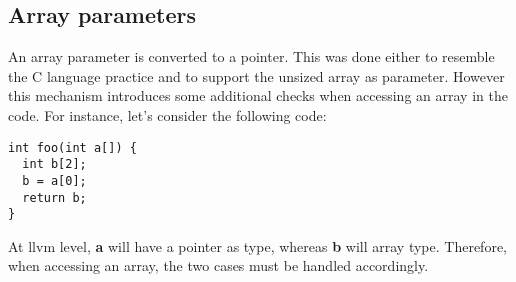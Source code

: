 \documentclass{article}
\begin{document}
\subsection*{Array parameters}
An array parameter is converted to a pointer. This was done either to resemble the C language practice
and to support the unsized array as parameter.
However this mechanism introduces some additional checks when accessing an array in the code.
For instance, let's consider the following code:
\begin{lstlisting}[basicstyle=\ttfamily\fontsize{8pt}{14pt}, keywordstyle=\color{blue}, commentstyle=\color{green}]
int foo(int a[]) {
  int b[2];
  b = a[0];
  return b;
}
\end{lstlisting}
At llvm level, \textbf{a} will have a pointer as type, whereas \textbf{b} will array type.
Therefore, when accessing an array, the two cases must be handled accordingly.
\end{document}
